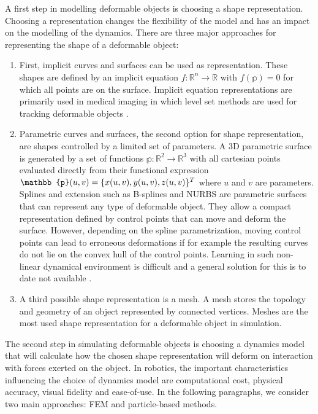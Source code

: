 \documentclass[\home/main.tex]{subfiles}
\begin{document}
A first step in modelling deformable objects is choosing a shape representation. Choosing a representation changes the flexibility of the model and has an impact on the modelling of the dynamics. There are three major approaches for representing the shape of a deformable object:
\begin{enumerate}
	\item First, implicit curves and surfaces can be used as representation. These shapes are defined by an implicit equation $f: \mathbb{R}^{n} \rightarrow \mathbb{R}$ with $f(\mathbb{p}) = 0$ for which all points are on the surface. Implicit equation representations are primarily used in medical imaging in which level set methods are used for tracking deformable objects \autocite{Cremers2006}. 
	\item Parametric curves and surfaces, the second option for shape representation, are shapes controlled by a limited set of parameters. A 3D parametric surface is generated by a set of functions $\mathbb{p}: \mathbb{R}^{2} \rightarrow \mathbb{R}^{3}$ with all cartesian points evaluated directly from their functional expression $\mathbb{p}(u, v) =\\ \{x(u, v), y(u, v), z(u, v)\}^{T}$ where $u$ and $v$ are parameters. Splines and extension such as B-splines and NURBS are parametric surfaces that can represent any type of deformable object. They allow a compact representation defined by control points that can move and deform the surface. However, depending on the spline parametrization, moving control points can lead to erroneous deformations if for example the resulting curves do not lie on the convex hull of the control points. Learning in such non-linear dynamical environment is difficult and a general solution for this is to date not available \autocite{rios2020}.
	\item A third possible shape representation is a mesh. A mesh stores the topology and geometry of an object represented by connected vertices. Meshes are the most used shape representation for a deformable object in simulation.
\end{enumerate}

The second step in simulating deformable objects is choosing a dynamics model that will calculate how the chosen shape representation will deform on interaction with forces exerted on the object. In robotics, the important characteristics influencing the choice of dynamics model are computational cost, physical accuracy, visual fidelity and ease-of-use. In the following paragraphs, we consider two main approaches: \gls{FEM} and particle-based methods.
\end{document}

